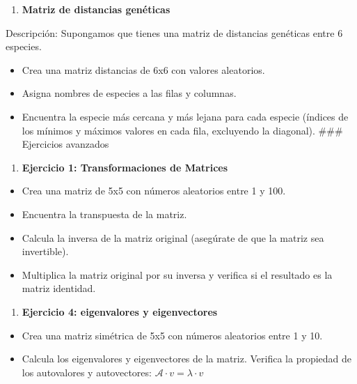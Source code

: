 \documentclass[
]{book}
\providecommand{\tightlist}{%
  \setlength{\itemsep}{0pt}\setlength{\parskip}{0pt}}
\begin{document}
\begin{enumerate}
\def\labelenumi{\arabic{enumi}.}
\setcounter{enumi}{14}
\tightlist
\item
  \textbf{Matriz de distancias genéticas}
\end{enumerate}

Descripción: Supongamos que tienes una matriz de distancias genéticas entre 6 especies.

\begin{itemize}
\tightlist
\item
  Crea una matriz distancias de 6x6 con valores aleatorios.
\item
  Asigna nombres de especies a las filas y columnas.
\item
  Encuentra la especie más cercana y más lejana para cada especie (índices de los mínimos y máximos valores en cada fila, excluyendo la diagonal).
  \#\#\# Ejercicios avanzados
\end{itemize}

\begin{enumerate}
\def\labelenumi{\arabic{enumi}.}
\tightlist
\item
  \textbf{Ejercicio 1: Transformaciones de Matrices}
\end{enumerate}

\begin{itemize}
\tightlist
\item
  Crea una matriz de 5x5 con números aleatorios entre 1 y 100.
\item
  Encuentra la transpuesta de la matriz.
\item
  Calcula la inversa de la matriz original (asegúrate de que la matriz sea invertible).
\item
  Multiplica la matriz original por su inversa y verifica si el resultado es la matriz identidad.
\end{itemize}

\begin{enumerate}
\def\labelenumi{\arabic{enumi}.}
\setcounter{enumi}{1}
\tightlist
\item
  \textbf{Ejercicio 4: eigenvalores y eigenvectores}
\end{enumerate}

\begin{itemize}
\tightlist
\item
  Crea una matriz simétrica de 5x5 con números aleatorios entre 1 y 10.
\item
  Calcula los eigenvalores y eigenvectores de la matriz.
  Verifica la propiedad de los autovalores y autovectores:
  \(\mathcal A⋅v=λ⋅v\)
\end{itemize}
\end{document}
